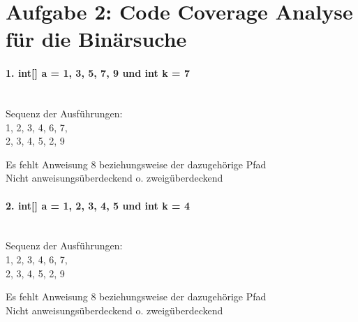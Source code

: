 \section*{Aufgabe 2: Code Coverage Analyse für die Binärsuche}

\paragraph{1. int[] a = {1, 3, 5, 7, 9} und int k = 7}\mbox{}\\
Sequenz der Ausführungen:\\
1, 2, 3, 4, 6, 7,\\
2, 3, 4, 5, 2, 9

Es fehlt Anweisung 8 beziehungsweise der dazugehörige Pfad\\
Nicht anweisungsüberdeckend o. zweigüberdeckend
\paragraph{2. int[] a = {1, 2, 3, 4, 5} und int k = 4}\mbox{}\\
Sequenz der Ausführungen:\\
1, 2, 3, 4, 6, 7,\\
2, 3, 4, 5, 2, 9

Es fehlt Anweisung 8 beziehungsweise der dazugehörige Pfad\\
Nicht anweisungsüberdeckend o. zweigüberdeckend